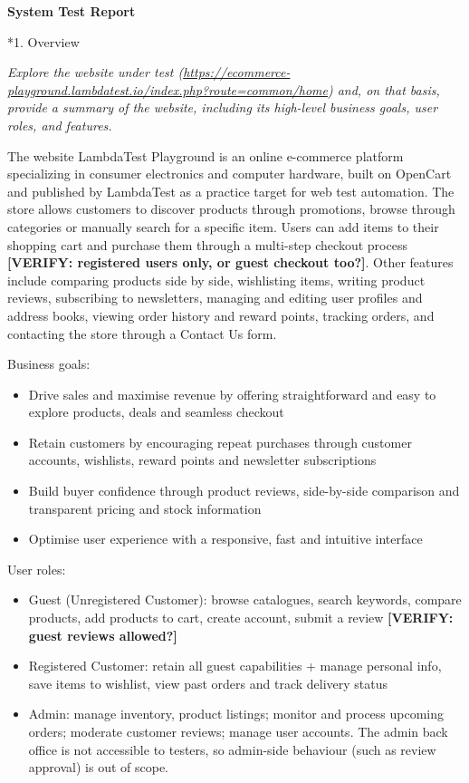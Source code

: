 \documentclass[11pt,a4paper]{article}
\makeatletter
\renewcommand\section{\@startsection{section}{1}{0pt}{3ex plus 1ex}{1.2ex}{\LARGE\bfseries}}
\newcommand{\instr}[1]{{\color{utsblue}\itshape #1\par}}
\newcommand{\VERIFY}[1]{\textcolor{orange!85!black}{\textbf{[VERIFY: #1]}}}
\makeatother
\begin{document}
\begin{center}
  {\huge\bfseries System Test Report}
\end{center}

\section*{1. Overview}
\instr{Explore the website under test (\url{https://ecommerce-playground.lambdatest.io/index.php?route=common/home}) and, on that basis, provide a summary of the website, including its high-level business goals, user roles, and features.}

The website LambdaTest Playground is an online e-commerce platform specializing in consumer electronics and computer hardware, built on OpenCart and published by LambdaTest as a practice target for web test automation. The store allows customers to discover products through promotions, browse through categories or manually search for a specific item. Users can add items to their shopping cart and purchase them through a multi-step checkout process \VERIFY{registered users only, or guest checkout too?}. Other features include comparing products side by side, wishlisting items, writing product reviews, subscribing to newsletters, managing and editing user profiles and address books, viewing order history and reward points, tracking orders, and contacting the store through a Contact Us form.

Business goals:
\begin{itemize}
  \item Drive sales and maximise revenue by offering straightforward and easy to explore products, deals and seamless checkout
  \item Retain customers by encouraging repeat purchases through customer accounts, wishlists, reward points and newsletter subscriptions
  \item Build buyer confidence through product reviews, side-by-side comparison and transparent pricing and stock information
  \item Optimise user experience with a responsive, fast and intuitive interface
\end{itemize}

User roles:
\begin{itemize}
  \item Guest (Unregistered Customer): browse catalogues, search keywords, compare products, add products to cart, create account, submit a review \VERIFY{guest reviews allowed?}
  \item Registered Customer: retain all guest capabilities + manage personal info, save items to wishlist, view past orders and track delivery status
  \item Admin: manage inventory, product listings; monitor and process upcoming orders; moderate customer reviews; manage user accounts. The admin back office is not accessible to testers, so admin-side behaviour (such as review approval) is out of scope.
\end{itemize}
\end{document}
